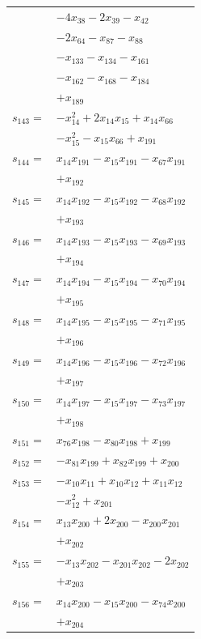 \begin{longtable}{@{}r@{\;}l@{}}
 & \(\displaystyle -4x_{38} -2x_{39} -x_{42}\) \\
 & \(\displaystyle -2x_{64} -x_{87} -x_{88}\) \\
 & \(\displaystyle -x_{133} -x_{134} -x_{161}\) \\
 & \(\displaystyle -x_{162} -x_{168} -x_{184}\) \\
 & \(\displaystyle +x_{189}\) \\[3pt]
\(s_{143}=\) & \(\displaystyle -x_{14}^{2} +2x_{14}x_{15} +x_{14}x_{66}\) \\
 & \(\displaystyle -x_{15}^{2} -x_{15}x_{66} +x_{191}\) \\[3pt]
\(s_{144}=\) & \(\displaystyle x_{14}x_{191} -x_{15}x_{191} -x_{67}x_{191}\) \\
 & \(\displaystyle +x_{192}\) \\[3pt]
\(s_{145}=\) & \(\displaystyle x_{14}x_{192} -x_{15}x_{192} -x_{68}x_{192}\) \\
 & \(\displaystyle +x_{193}\) \\[3pt]
\(s_{146}=\) & \(\displaystyle x_{14}x_{193} -x_{15}x_{193} -x_{69}x_{193}\) \\
 & \(\displaystyle +x_{194}\) \\[3pt]
\(s_{147}=\) & \(\displaystyle x_{14}x_{194} -x_{15}x_{194} -x_{70}x_{194}\) \\
 & \(\displaystyle +x_{195}\) \\[3pt]
\(s_{148}=\) & \(\displaystyle x_{14}x_{195} -x_{15}x_{195} -x_{71}x_{195}\) \\
 & \(\displaystyle +x_{196}\) \\[3pt]
\(s_{149}=\) & \(\displaystyle x_{14}x_{196} -x_{15}x_{196} -x_{72}x_{196}\) \\
 & \(\displaystyle +x_{197}\) \\[3pt]
\(s_{150}=\) & \(\displaystyle x_{14}x_{197} -x_{15}x_{197} -x_{73}x_{197}\) \\
 & \(\displaystyle +x_{198}\) \\[3pt]
\(s_{151}=\) & \(\displaystyle x_{76}x_{198} -x_{80}x_{198} +x_{199}\) \\[3pt]
\(s_{152}=\) & \(\displaystyle -x_{81}x_{199} +x_{82}x_{199} +x_{200}\) \\[3pt]
\(s_{153}=\) & \(\displaystyle -x_{10}x_{11} +x_{10}x_{12} +x_{11}x_{12}\) \\
 & \(\displaystyle -x_{12}^{2} +x_{201}\) \\[3pt]
\(s_{154}=\) & \(\displaystyle x_{13}x_{200} +2x_{200} -x_{200}x_{201}\) \\
 & \(\displaystyle +x_{202}\) \\[3pt]
\(s_{155}=\) & \(\displaystyle -x_{13}x_{202} -x_{201}x_{202} -2x_{202}\) \\
 & \(\displaystyle +x_{203}\) \\[3pt]
\(s_{156}=\) & \(\displaystyle x_{14}x_{200} -x_{15}x_{200} -x_{74}x_{200}\) \\
 & \(\displaystyle +x_{204}\) \\[3pt]
\end{longtable}
\endgroup
